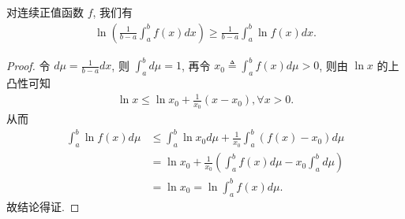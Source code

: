 \documentclass[../../main.tex]{subfiles}
\begin{document}
\begin{example}
对连续正值函数 $f$, 我们有
\begin{align*}
\ln\left(\frac{1}{b - a}\int_a^b f(x)dx\right) \geqslant \frac{1}{b - a}\int_a^b \ln f(x)dx.
\end{align*} 
\end{example}
\begin{proof}
令 $d\mu = \frac{1}{b - a}dx$, 则 $\int_a^b d\mu = 1$, 再令 $x_0 \triangleq \int_a^b f(x) d\mu>0$, 则由 $\ln x$ 的上凸性可知
\begin{align*}
\ln x \leqslant \ln x_0 + \frac{1}{x_0}(x - x_0), \forall x > 0.
\end{align*}
从而
\begin{align*}
\int_a^b \ln f(x) d\mu &\leqslant \int_a^b \ln x_0 d\mu + \frac{1}{x_0}\int_a^b (f(x) - x_0) d\mu \\
&= \ln x_0 + \frac{1}{x_0}\left(\int_a^b f(x) d\mu - x_0\int_a^b d\mu\right) \\
&= \ln x_0 = \ln \int_a^b f(x) d\mu.
\end{align*}
故结论得证.
\end{proof}
\end{document}
